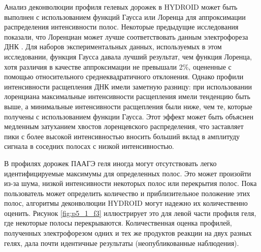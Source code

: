     Анализ деконволюции профиля гелевых дорожек в HYDROID может быть выполнен с использованием функций Гаусса или Лоренца для аппроксимации распределения интенсивности полос. Некоторые предыдущие исследования показали, что Лоренциан может лучше соответствовать данным электрофореза ДНК \cite{shadle_quantitative_1997}. Для наборов экспериментальных данных, используемых в этом исследовании, функция Гаусса давала лучший результат, чем функция Лоренца, хотя различия в качестве аппроксимации не превышали 2\%, оцененные с помощью относительного среднеквадратичного отклонения. Однако профили интенсивности расщепления ДНК имели заметную разницу: при использовании лоренциана максимальные интенсивности расщепления имели тенденцию быть выше, а минимальные интенсивности расщепления были ниже, чем те, которые получены с использованием функции Гаусса. Этот эффект может быть объяснен медленным затуханием хвостов лоренцевского распределения, что заставляет пики с более высокой интенсивностью вносить больший вклад в амплитуду сигнала в соседних полосах с низкой интенсивностью.
    
    В профилях дорожек ПААГЭ геля иногда могут отсутствовать легко идентифицируемые максимумы для определенных полос. Это может произойти из-за шума, низкой интенсивности некоторых полос или перекрытия полос. Пока пользователь может определить количество и приблизительное положение этих полос, алгоритмы деконволюции HYDROID могут надежно их количественно оценить. Рисунок \ref{fig:p5_1_f3} иллюстрирует это для левой части профиля геля, где некоторые полосы перекрываются. Количественная оценка профилей, полученных электрофорезом одних и тех же продуктов реакции на двух разных гелях, дала почти идентичные результаты (неопубликованные наблюдения).
    
    
